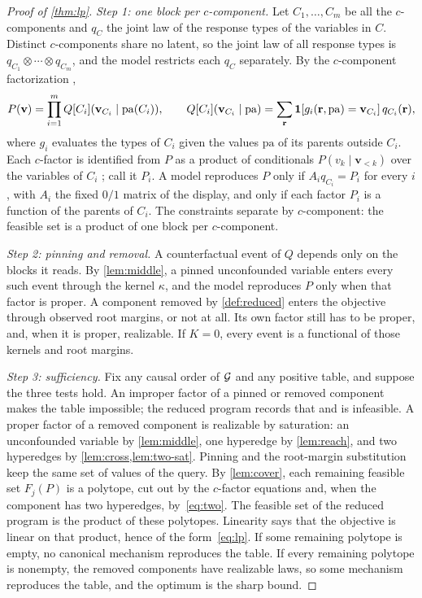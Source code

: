 \begin{proof}[Proof of \cref{thm:lp}]
\emph{Step 1: one block per $c$-component.} Let $C_1,\ldots,C_m$ be all the
$c$-components and $q_{C}$ the joint law of the response types of the
variables in $C$. Distinct $c$-components share no latent, so the joint law
of all response types is $q_{C_1}\otimes\cdots\otimes q_{C_m}$, and the
model restricts each $q_C$ separately. By the $c$-component factorization
\citep{tian2002general},
\[
P(\mathbf{v})=\prod_{i=1}^m Q[C_i](\mathbf{v}_{C_i}\mid\mathrm{pa}(C_i)),
\qquad
Q[C_i](\mathbf{v}_{C_i}\mid\mathrm{pa})=\sum_{\mathbf{r}}
\mathbf{1}[g_i(\mathbf{r},\mathrm{pa})=\mathbf{v}_{C_i}]\,q_{C_i}(\mathbf{r}),
\]
where $g_i$ evaluates the types of $C_i$ given the values $\mathrm{pa}$ of
its parents outside $C_i$. Each $c$-factor is identified
from $P$ as a product of conditionals $P(v_k\mid\mathbf{v}_{<k})$ over the
variables of $C_i$ \citep{tian2002general}; call it $P_i$. A model reproduces $P$ only if $A_i q_{C_i}=P_i$ for every $i$, with $A_i$ the
fixed $0/1$ matrix of the display, and only if each factor $P_i$ is a function of the parents of $C_i$. The constraints separate by $c$-component: the feasible set is a product of one block
per $c$-component.

\emph{Step 2: pinning and removal.} A counterfactual event of $Q$ depends only on the blocks it reads. By \cref{lem:middle}, a pinned unconfounded variable enters every such event through the kernel $\kappa$, and the model reproduces $P$ only when that factor is proper. A component removed by \cref{def:reduced} enters the objective through observed root margins, or not at all. Its own factor still has to be proper, and, when it is proper, realizable. If $K=0$, every event is a functional of those kernels and root margins.

\emph{Step 3: sufficiency.} Fix any causal order of $\mathcal{G}$ and any positive table, and suppose the three tests hold. An improper factor of a pinned or removed component makes the table impossible; the reduced program records that and is infeasible. A proper factor of a removed component is realizable by saturation: an unconfounded variable by \cref{lem:middle}, one hyperedge by \cref{lem:reach}, and two hyperedges by \cref{lem:cross,lem:two-sat}. Pinning and the root-margin substitution keep the same set of values of the query. By \cref{lem:cover}, each remaining feasible set $F_j(P)$ is a polytope, cut out by the $c$-factor equations and, when the component has two hyperedges, by~\eqref{eq:two}. The feasible set of the reduced program is the product of these polytopes. Linearity says that the objective is linear on that product, hence of the form~\eqref{eq:lp}. If some remaining polytope is empty, no canonical mechanism reproduces the table. If every remaining polytope is nonempty, the removed components have realizable laws, so some mechanism reproduces the table, and the optimum is the sharp bound.


\end{proof}

